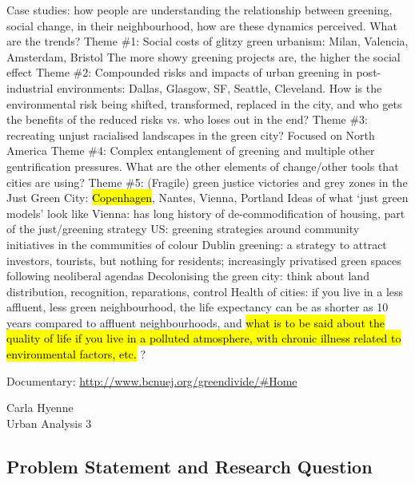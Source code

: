 \documentclass{article}
\begin{document}
\begin{outline}
	\1 Case studies: how people are understanding the relationship between greening, social change, in their neighbourhood, how are these dynamics perceived. What are the trends?
	\1 Theme \#1: Social costs of glitzy green urbanism: Milan, Valencia, Amsterdam, Bristol
		\2 The more showy greening projects are, the higher the social effect
	\1 Theme \#2: Compounded risks and impacts of urban greening in post-industrial environments: Dallas, Glasgow, SF, Seattle, Cleveland. How is the environmental risk being shifted, transformed, replaced in the city, and who gets the benefits of the reduced risks vs. who loses out in the end?
	\1 Theme \#3: recreating unjust racialised landscapes in the green city? Focused on North America
	\1 Theme \#4: Complex entanglement of greening and multiple other gentrification pressures. What are the other elements of change/other tools that cities are using?
	\1 Theme \#5: (Fragile) green justice victories and grey zones in the Just Green City: \hl{Copenhagen}, Nantes, Vienna, Portland
		\2 Ideas of what `just green models' look like
		\2 Vienna: has long history of de-commodification of housing, part of the just/greening strategy
		\2 US: greening strategies around community initiatives in the communities of colour
	\1 Dublin greening: a strategy to attract investors, tourists, but nothing for residents; increasingly privatised green spaces following neoliberal agendas
	\1 Decolonising the green city: think about land distribution, recognition, reparations, control
	\1 Health of cities: if you live in a less affluent, less green neighbourhood, the life expectancy can be as shorter as 10 years compared to affluent neighbourhoods, and \hl{what is to be said about the quality of life if you live in a polluted atmosphere, with chronic illness related to environmental factors, etc.}
	?
\end{outline}

Documentary: \url{http://www.bcnuej.org/greendivide/#Home}



\pagebreak

\begin{flushright}
Carla Hyenne\\
Urban Analysis 3
\end{flushright}

\subsection{Problem Statement and Research Question}
\end{document}
